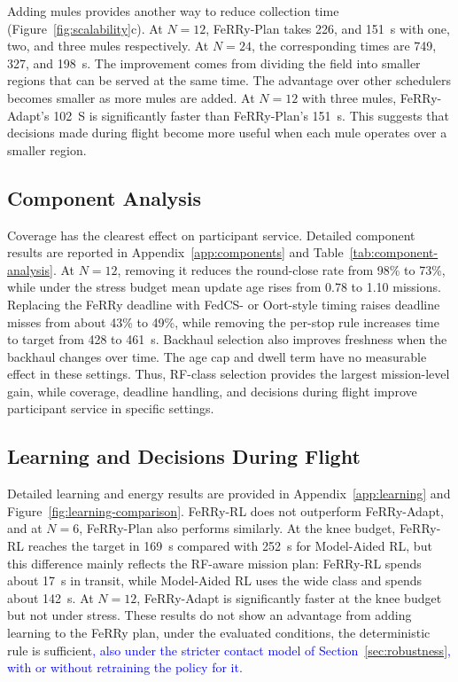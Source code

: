 \documentclass[conference]{IEEEtran}
\newcommand{\sysname}{FeRRy}
\begin{document}
Adding mules provides another way to reduce collection time
(Figure~\ref{fig:scalability}c). At \(N=12\), \sysname{}-Plan takes 226, and 151~s with one, two, and three mules respectively. At
\(N=24\), the corresponding times are 749, 327, and 198~s. The improvement
comes from dividing the field into smaller regions that can be served at the
same time. The advantage over other schedulers becomes smaller as more mules
are added. At \(N=12\) with three mules, \sysname{}-Adapt's 102~S is significantly
faster than \sysname{}-Plan's 151~s. This suggests that decisions made during
flight become more useful when each mule operates over a smaller region.

\subsection{Component Analysis}
\label{sec:components}

Coverage has the clearest
effect on participant service. Detailed component results are reported in
Appendix~\ref{app:components} and Table~\ref{tab:component-analysis}.
At \(N=12\), removing it reduces the round-close rate from 98\% to 73\%, while under
the stress budget mean update age rises from 0.78 to 1.10 missions.
Replacing the \sysname{} deadline with FedCS- or Oort-style timing raises
deadline misses from about 43\% to 49\%, while removing the per-stop rule
increases time to target from 428 to 461~s. Backhaul selection also improves
freshness when the backhaul changes over time. The age cap and dwell term have
no measurable effect in these settings. Thus, RF-class selection provides
the largest mission-level gain, while coverage, deadline handling, and
decisions during flight improve participant service in specific settings.

\subsection{Learning and Decisions During Flight}
\label{sec:learning}

Detailed learning and energy results are provided in
Appendix~\ref{app:learning} and Figure~\ref{fig:learning-comparison}.
\sysname{}-RL does not outperform \sysname{}-Adapt, and at \(N=6\),
\sysname{}-Plan also performs similarly. At the knee budget,
\sysname{}-RL reaches the target in 169~s compared with 252~s for
Model-Aided RL, but this difference mainly reflects the RF-aware mission plan:
\sysname{}-RL spends about 17~s in transit, while Model-Aided RL uses the wide
class and spends about 142~s. At \(N=12\), \sysname{}-Adapt is significantly
faster at the knee budget but not under stress. These results do not show an
advantage from adding learning to the \sysname{} plan, under the evaluated
conditions, the deterministic rule is sufficient\textcolor{blue}{, also under the
stricter contact model of Section~\ref{sec:robustness}, with or without
retraining the policy for it}.
\end{document}
